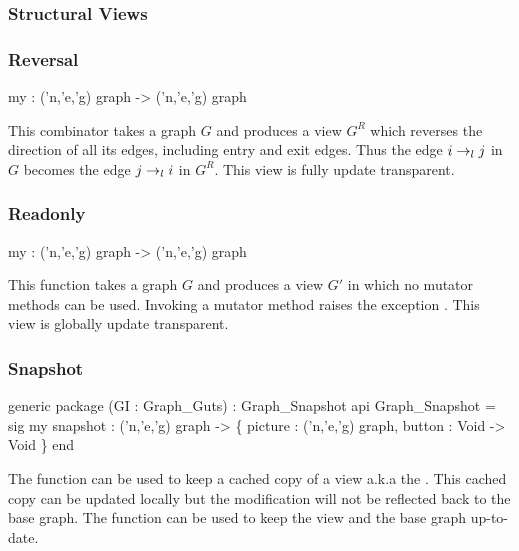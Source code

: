 \subsubsection{Structural Views}\label{sec:structural-views}

\subsubsection{Reversal}
\begin{SML}
   my  : ('n,'e,'g) graph -> ('n,'e,'g) graph
\end{SML}
   This combinator takes a graph $G$ and produces a view $G^R$
which reverses the direction
of all its edges, including entry and exit edges.  Thus 
the edge $i \rightarrow_{l} j$ in $G$ becomes the edge
$j \rightarrow_{l} i$ in $G^R$.  This view is fully update transparent.

\subsubsection{Readonly}
\begin{SML}
   my  : ('n,'e,'g) graph -> ('n,'e,'g) graph
\end{SML} 
  This function takes a graph $G$ and produces a view $G'$
in which no mutator methods can be used.  Invoking a mutator
method raises the exception .
This view is globally update transparent.

\subsubsection{Snapshot}
\begin{SML}
   generic package (GI : Graph_Guts) : Graph_Snapshot 
   api Graph_Snapshot = sig
      my snapshot : ('n,'e,'g) graph -> 
        \{ picture : ('n,'e,'g) graph, button : Void -> Void \}
   end
\end{SML}

The function  can be used to keep a cached copy
of a view a.k.a the .    This cached copy
can be updated locally but the modification will not be reflected back
to the base graph.  The function  can be used to
keep the view and the base graph up-to-date.

